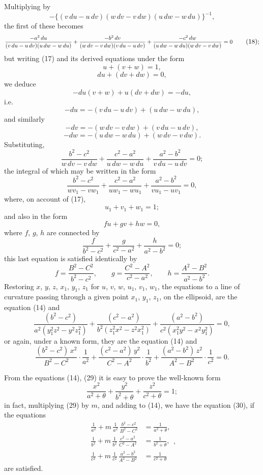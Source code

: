 \documentclass[11pt]{article}
\begin{document}
Multiplying by
\[
-\{(v\,du - u\,dv)(w\,dv - v\,dw)(u\,dw - w\,du)\}^{-1},
\]
the first of these becomes
\[
\resizebox{\textwidth}{!}{$\displaystyle
\frac{-a^2\,du}{(v\,du - u\,dv)(u\,dw - w\,du)} + \frac{-b^2\,dv}{(w\,dv - v\,dw)(v\,du - u\,dv)} + \frac{-c^2\,dw}{(u\,dw - w\,du)(w\,dv - v\,dw)} = 0
$} \tag{18};
\]
but writing (17) and its derived equations under the form
\[
u + (v + w) = 1 \tag{19},
\]
\[
du + (dv + dw) = 0,
\]
we deduce
\[
-du(v + w) + u(dv + dw) = -du \tag{20},
\]
i.e.
\[
-du = -(v\,du - u\,dv) + (u\,dw - w\,du) \tag{21},
\]
and similarly
\[
-dv = -(w\,dv - v\,dw) + (v\,du - u\,dv),
\]
\[
-dw = -(u\,dw - w\,du) + (w\,dv - v\,dw).
\]
Substituting,
\[
\frac{b^2 - c^2}{w\,dv - v\,dw} + \frac{c^2 - a^2}{u\,dw - w\,du} + \frac{a^2 - b^2}{v\,du - u\,dv} = 0 \tag{22};
\]
the integral of which may be written in the form
\[
\frac{b^2 - c^2}{w v_1 - v w_1} + \frac{c^2 - a^2}{u w_1 - w u_1} + \frac{a^2 - b^2}{v u_1 - u v_1} = 0 \tag{23},
\]
where, on account of (17),
\[
u_1 + v_1 + w_1 = 1 \tag{24};
\]
and also in the form
\[
f u + g v + h w = 0 \tag{25},
\]
where $f$, $g$, $h$ are connected by
\[
\frac{f}{b^2 - c^2} + \frac{g}{c^2 - a^2} + \frac{h}{a^2 - b^2} = 0 \tag{26};
\]
this last equation is satisfied identically by
\[
f = \frac{B^2 - C^2}{b^2 - c^2}, \qquad g = \frac{C^2 - A^2}{c^2 - a^2}, \qquad h = \frac{A^2 - B^2}{a^2 - b^2} \tag{27}.
\]
Restoring $x$, $y$, $z$, $x_1$, $y_1$, $z_1$ for $u$, $v$, $w$, $u_1$, $v_1$, $w_1$, the equations to a line of curvature passing through a given point $x_1$, $y_1$, $z_1$, on the ellipsoid, are the equation (14) and
\[
\frac{(b^2 - c^2)}{a^2(y_1^2 z^2 - y^2 z_1^2)} + \frac{(c^2 - a^2)}{b^2(z_1^2 x^2 - z^2 x_1^2)} + \frac{(a^2 - b^2)}{c^2(x_1^2 y^2 - x^2 y_1^2)} = 0 \tag{28},
\]
or again, under a known form, they are the equation (14) and
\[
\frac{(b^2 - c^2)\,x^2}{B^2 - C^2} \cdot \frac{1}{a^2} + \frac{(c^2 - a^2)\,y^2}{C^2 - A^2} \cdot \frac{1}{b^2} + \frac{(a^2 - b^2)\,z^2}{A^2 - B^2} \cdot \frac{1}{c^2} = 0 \tag{29}.
\]

From the equations (14), (29) it is easy to prove the well-known form
\[
\frac{x^2}{a^2 + \theta} + \frac{y^2}{b^2 + \theta} + \frac{z^2}{c^2 + \theta} = 1 \tag{30};
\]
in fact, multiplying (29) by $m$, and adding to (14), we have the equation (30), if the equations
\[
\begin{aligned}
\frac{1}{a^2} + m\,\frac{1}{a^2}\,\frac{b^2 - c^2}{B^2 - C^2} &= \frac{1}{a^2 + \theta}, \\
\frac{1}{b^2} + m\,\frac{1}{b^2}\,\frac{c^2 - a^2}{C^2 - A^2} &= \frac{1}{b^2 + \theta}, \\
\frac{1}{c^2} + m\,\frac{1}{c^2}\,\frac{a^2 - b^2}{A^2 - B^2} &= \frac{1}{c^2 + \theta}
\end{aligned}
\tag{31},
\]
are satisfied.
\end{document}

